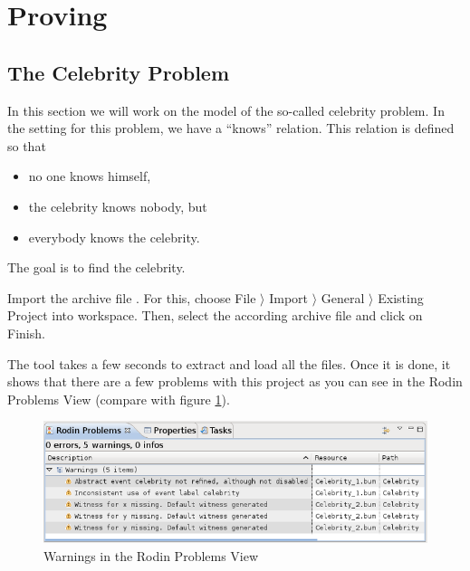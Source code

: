 \section{Proving}
\label{tutorial_08}


\subsection{The Celebrity Problem}

In this section we will work on the model of the so-called celebrity problem. In the setting for this problem, we have a ``knows'' relation. This relation is defined so that

\begin{itemize}
	\item no one knows himself,
	\item the celebrity knows nobody, but
	\item everybody knows the celebrity.
\end{itemize}    

The goal is to find the celebrity.


Import the archive file . For this, choose \textsf{File $\rangle $ Import $\rangle $ General $\rangle $ Existing Project into workspace}. Then, select the according archive file and click on \textsf{Finish}.

The tool takes a few seconds to extract and load all the files. Once it is done, it shows that there are a few problems with this project as you can see in the Rodin Problems View (compare with figure \ref{fig_tut_08_rodin_problemview}).

\begin{figure}[!h]
\begin{center}
	\includegraphics{img/tutorial/tut_08_rodin_problems.png}
	\caption{Warnings in the Rodin Problems View}
	\label{fig_tut_08_rodin_problemview}
\end{center}
\end{figure}

